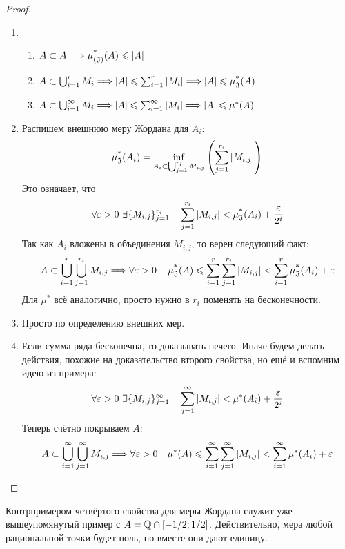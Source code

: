 \begin{proof}~
	\begin{enumerate}
		\item \begin{enumerate}
			\item \(A \subset A \Longrightarrow \operatorname{\mu^*_{(\mathfrak{J})}}(A) \leqslant |A|\)
			
			\item \(A \subset \bigcup_{i = 1}^r M_i \Longrightarrow |A| \leqslant \sum_{i = 1}^r |M_i| \Longrightarrow |A| \leqslant \operatorname{\mu^*_\mathfrak{J}}(A)\)
			
			\item \(A \subset \bigcup_{i = 1}^\infty M_i \Longrightarrow |A| \leqslant \sum_{i = 1}^\infty |M_i| \Longrightarrow |A| \leqslant \mu^*(A)\)
		\end{enumerate}
	
		\item Распишем внешнюю меру Жордана для $A_i$:
		\[
			\operatorname{\mu^*_\mathfrak{J}}(A_i) = \inf_{A_i \subset \bigcup_{j = 1}^{r_i} M_{i, j}} \left(\sum\limits_{j = 1}^{r_i} |M_{i, j}|\right)
		\]
		Это означает, что
		\[
			\forall \eps > 0\ \exists \{M_{i, j}\}_{j = 1}^{r_i} \quad \suml_{j = 1}^{r_i} |M_{i, j}| < \upjm(A_i) + \frac{\eps}{2^i}
		\]
		Так как $A_i$ вложены в объединения $M_{i, j}$, то верен следующий факт:
		\[
			A \subset \bigcup_{i = 1}^r \bigcup_{j = 1}^{r_i} M_{i, j} \Longrightarrow \forall \varepsilon > 0 \quad  \operatorname{\mu^*_\mathfrak{J}}(A) \leqslant \sum\limits_{i = 1}^r \sum\limits_{j = 1}^{r_i} |M_{i, j}| < \sum\limits_{i = 1}^r \operatorname{\mu^*_\mathfrak{J}}(A_i) + \varepsilon
		\]
		Для $\mu^*$ всё аналогично, просто нужно в $r_i$ поменять на бесконечности.
		
		\item Просто по определению внешних мер.
		
		\item Если сумма ряда бесконечна, то доказывать нечего. Иначе будем делать действия, похожие на доказательство второго свойства, но ещё и вспомним идею из примера:
		\[
			\forall \varepsilon > 0\ \exists \{M_{i, j}\}_{j = 1}^\infty \quad \sum\limits_{j = 1}^\infty |M_{i, j}| < \mu^*(A_i) + \frac{\varepsilon}{2^i}
		\]
		Теперь счётно покрываем $A$:
		\[
			A \subset \bigcup_{i = 1}^\infty \bigcup_{j = 1}^\infty M_{i, j} \Longrightarrow \forall \varepsilon > 0 \quad \mu^*(A) \leqslant \sum\limits_{i = 1}^\infty \sum\limits_{j = 1}^\infty |M_{i, j}| < \sum\limits_{i = 1}^\infty \mu^*(A_i) + \varepsilon
		\]
	\end{enumerate}
\end{proof}

\begin{note}
	Контрпримером четвёртого свойства для меры Жордана служит уже вышеупомянутый пример с $A = \mathbb{Q} \cap [-1/2; 1/2]$. Действительно, мера любой рациональной точки будет ноль, но вместе они дают единицу.
\end{note}

